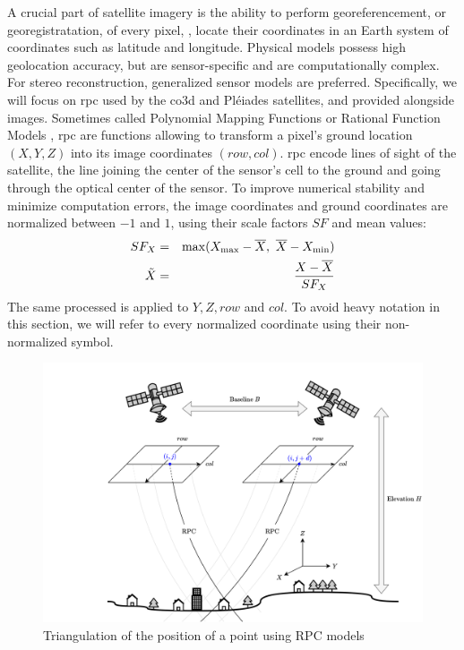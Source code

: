 A crucial part of satellite imagery is the ability to perform georeferencement, or georegistratation, of every pixel, \ie, locate their coordinates in an Earth system of coordinates such as latitude and longitude. Physical models possess high geolocation accuracy, but are sensor-specific and are computationally complex. For stereo reconstruction,  generalized sensor models are preferred. Specifically, we will focus on \acrfull{rpc} \cite{grodecki_ikonos_2001} used by the \acrshort{co3d} and Pléiades satellites, and provided alongside images. Sometimes called Polynomial Mapping Functions \cite{baltsavias_metric_1992} or Rational Function Models \cite{tao_comprehensive_2001}, \acrshort{rpc} are functions allowing to transform a pixel's ground location $(X,Y,Z)$ into its image coordinates $(row, col)$. \acrshort{rpc} encode lines of sight of the satellite, \ie the line joining the center of the sensor's cell to the ground and going through the optical center of the sensor. To improve numerical stability and minimize computation errors, the image coordinates and ground coordinates are normalized between $-1$ and $1$, using their scale factors $SF$ and mean values:
\begin{eqnarray*}
    SF_X &=& \max(X_\mathrm{max}-\overline{X},~\overline{X}-X_\mathrm{min})\\
    \Tilde{X}&=&\frac{X-\overline{X}}{SF_X}
\end{eqnarray*}
The same processed is applied to $Y,Z,row$ and $col$. To avoid heavy notation in this section, we will refer to every normalized coordinate using their non-normalized symbol.

\begin{figure}
    \centering
    \includegraphics[width=0.8\linewidth]{Images/Chap_1/RPC.png}
    \caption{Triangulation of the position of a point using RPC models}
    \label{fig:RPC}
\end{figure}

